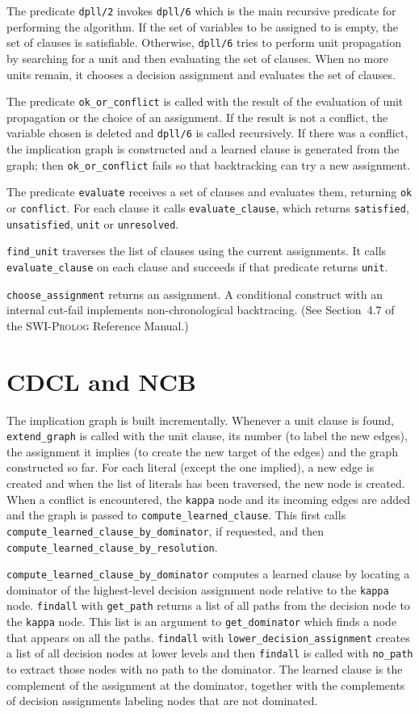 \documentclass[11pt]{article}
\newcommand*{\p}[1]{\textup{\texttt{#1}}}
\newcommand*{\sw}{\textsc{SWI-Prolog}}
\begin{document}
The predicate \p{dpll/2} invokes \p{dpll/6} which is the main recursive
predicate for performing the algorithm. If the set of variables to be
assigned to is empty, the set of clauses is satisfiable. Otherwise,
\p{dpll/6} tries to perform unit propagation by searching for a unit and
then evaluating the set of clauses. When no more units remain, it
chooses a decision assignment and evaluates the set of clauses.

The predicate \p{ok\_or\_conflict} is called with the result of the
evaluation of unit propagation or the choice of an assignment. If the
result is not a conflict, the variable chosen is deleted and \p{dpll/6}
is called recursively. If there was a conflict, the implication graph is
constructed and a learned clause is generated from the graph; then
\p{ok\_or\_conflict} fails so that backtracking can try a new
assignment.

The predicate \p{evaluate} receives a set of clauses and evaluates them,
returning \p{ok} or \p{conflict}. For each clause it calls
\p{evaluate\_clause}, which returns \p{satisfied}, \p{unsatisfied},
\p{unit} or \p{unresolved}.

\p{find\_unit} traverses the list of clauses using the current
assignments. It calls \p{evaluate\_clause} on each clause and succeeds
if that predicate returns \p{unit}.

\p{choose\_assignment} returns an assignment. A conditional construct
with an internal cut-fail implements non-chronological backtracing. (See
Section~4.7 of the \sw{} Reference Manual.)


\section{CDCL and NCB}

The implication graph is built incrementally. Whenever a unit clause is
found, \p{extend\_graph} is called with the unit clause, its number (to
label the new edges), the assignment it implies (to create the new
target of the edges) and the graph constructed so far. For each literal
(except the one implied), a new edge is created and when the list of
literals has been traversed, the new node is created. When a conflict is
encountered, the \p{kappa} node and its incoming edges are added and the
graph is passed to \p{compute\_learned\_clause}. This first calls
\p{compute\_learned\_clause\_by\_dominator}, if requested, and then
\p{compute\_learned\_clause\_by\_resolution}. 

\p{compute\_learned\_clause\_by\_dominator} computes a learned clause by
locating a dominator of the highest-level decision assignment node
relative to the \p{kappa} node. \p{findall} with \p{get\_path} returns a
list of all paths from the decision node to the \p{kappa} node. This
list is an argument to \p{get\_dominator} which finds a node that
appears on all the paths. \p{findall} with
\p{lower\_decision\_assignment} creates a list of all decision nodes at
lower levels and then \p{findall} is called with \p{no\_path} to extract
those nodes with no path to the dominator. The learned clause is the
complement of the assignment at the dominator, together with the
complements of decision assignments labeling nodes that are not
dominated.
\end{document}
